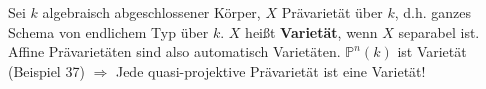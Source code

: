 \begin{example}[38]
  Sei $k$ algebraisch abgeschlossener Körper, $X$ Prävarietät über
  $k$, d.h. ganzes Schema von endlichem Typ über $k$. $X$ heißt \textbf{Varietät},
  wenn $X$ separabel ist. Affine Prävarietäten sind also automatisch
  Varietäten. $\mathbb{P}^{n}(k)$ ist Varietät (Beispiel 37) $\Longrightarrow$
  Jede quasi-projektive Prävarietät ist eine Varietät!
\end{example}
